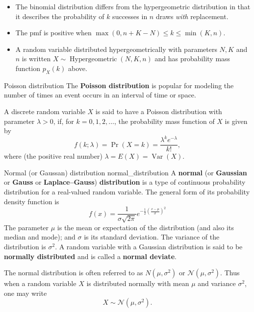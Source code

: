 \begin{itemize}
	\item The binomial distribution differs from the hypergeometric distribution in that it describes the probability of $k$ successes in $n$ draws \textit{with} replacement.
	\item The pmf is positive when $\max(0, n + K - N) \leq k \leq \min(K, n)$.
	\item A random variable distributed hypergeometrically with parameters $N, K$ and $n$ is written $X \sim \operatorname{Hypergeometric}(N, K, n)$ and has probability mass function $p_X(k)$ above.
\end{itemize}

\begin{definition}{Poisson distribution \cite{wikipedia_poisson_distribution}}{}
	The \textbf{Poisson distribution} is popular for modeling the number of times an event occurs in an interval of time or space.

	A discrete random variable $X$ is said to have a Poisson distribution with parameter $\lambda > 0$, if, for $k = 0, 1, 2, \ldots$, the probability mass function of $X$ is given by
	$$ f(k; \lambda) = \Pr(X = k)= \frac {\lambda^k e^{-\lambda}}{k!} , $$
	where (the positive real number) $\lambda = E(X) = \operatorname{Var}(X)$.
\end{definition}

\begin{definition}{Normal (or Gaussan) distribution \cite{}}{normal_distribution}
	A \textbf{normal} (or \textbf{Gaussian} or \textbf{Gauss} or \textbf{Laplace–Gauss}) \textbf{distribution} is a type of continuous probability distribution for a real-valued random variable. The general form of its probability density function is
	$$
		f(x) = \frac{1}{\sigma {\sqrt{2 \pi}}} 
		e^{-{\frac{1}{2}} \left( {\frac{x-\mu}{\sigma}} \right)^2}
	$$
	The parameter $\mu$ is the mean or expectation of the distribution (and also its median and mode); and $\sigma$ is its standard deviation. The variance of the distribution is $\sigma ^{2}$. A random variable with a Gaussian distribution is said to be \textbf{normally distributed} and is called a \textbf{normal deviate}.
\end{definition}

The normal distribution is often referred to as $N(\mu, \sigma^2)$ or $\mathcal{N}(\mu, \sigma^2)$. Thus when a random variable $X$ is distributed normally with mean $\mu$ and variance $\sigma^2$, one may write
$$ X \sim \mathcal{N}(\mu, \sigma^2) . $$

